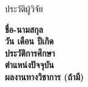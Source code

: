 \begin{center}
{\hOneSize ประวัติผู้วิจัย}
\end{center}
\vspace{6pt}

\noindent\textbf{ชื่อ-นามสกุล} \quad [ชื่อ-นามสกุล]\\
\textbf{วัน เดือน ปีเกิด} \quad [วัน เดือน ปี]\\
\textbf{ประวัติการศึกษา} \\
\textbf{ตำแหน่งปัจจุบัน} \\
\textbf{ผลงานทางวิชาการ (ถ้ามี)} 
